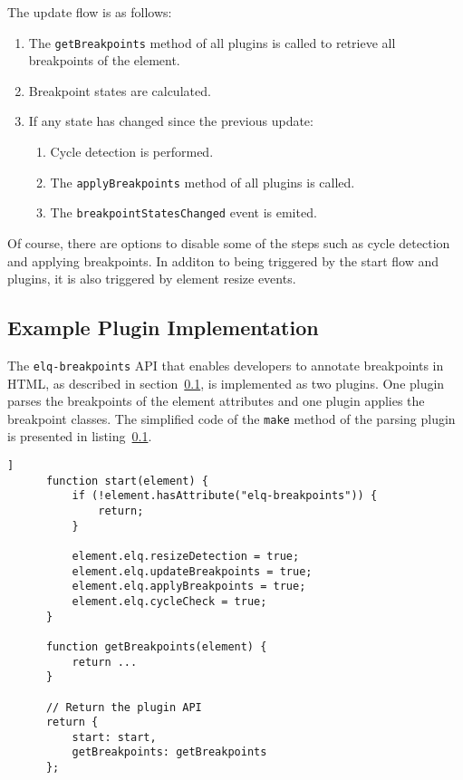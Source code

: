 \documentclass{acm_proc_article-sp}
\newcommand{\code}[1]{\texttt{#1}}
\begin{document}
  The update flow is as follows:
  \begin{enumerate}
    \item The \code{getBreakpoints} method of all plugins is called to retrieve all breakpoints of the element.
    \item Breakpoint states are calculated.
    \item If any state has changed since the previous update:
    \begin{enumerate}
      \item Cycle detection is performed.
      \item The \code{applyBreakpoints} method of all plugins is called.
      \item The \code{breakpointStatesChanged} event is emited.
    \end{enumerate}
  \end{enumerate}

  Of course, there are options to disable some of the steps such as cycle detection and applying breakpoints.
  In additon to being triggered by the start flow and plugins, it is also triggered by element resize events.

  \subsection{Example Plugin Implementation}
    The \code{elq-breakpoints} API that enables developers to annotate breakpoints in HTML, as described in section~\ref{}, is implemented as two plugins.
    One plugin parses the breakpoints of the element attributes and one plugin applies the breakpoint classes.
    The simplified code of the \code{make} method of the parsing plugin is presented in listing~\ref{}.
    \begin{lstlisting}[gobble=6,caption={},captionpos=b,label={}]]
      function start(element) {
          if (!element.hasAttribute("elq-breakpoints")) {
              return;
          }

          element.elq.resizeDetection = true;
          element.elq.updateBreakpoints = true;
          element.elq.applyBreakpoints = true;
          element.elq.cycleCheck = true;
      }

      function getBreakpoints(element) {
          return ...
      }

      // Return the plugin API
      return {
          start: start,
          getBreakpoints: getBreakpoints
      };
    \end{lstlisting}
\end{document}
